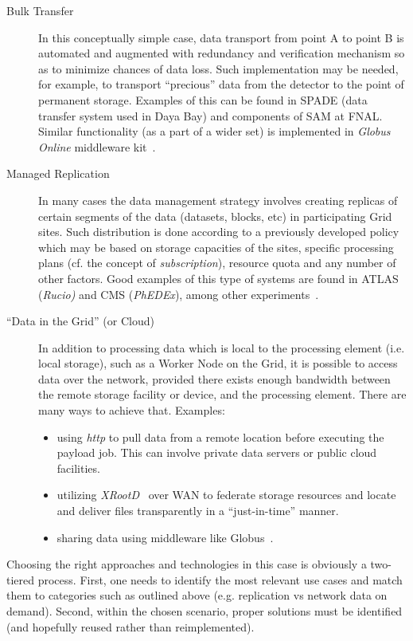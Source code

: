 \begin{description}
\item[Bulk Transfer] In this conceptually simple case, data transport from point A to point B is automated and augmented
with redundancy and verification mechanism so as to minimize chances of data loss. Such implementation may be needed,
for example, to transport ``precious'' data from the detector to the point of permanent storage.
Examples of this can be found in SPADE (data transfer system used in Daya Bay) and components of SAM at FNAL.
Similar functionality (as a part of a wider set) is implemented in \textit{Globus Online} middleware kit~\cite{globus}.

\item[Managed Replication] In many cases the data management strategy involves creating replicas of certain segments of the data (datasets, blocks, etc)
in participating Grid sites. Such distribution is done according to a previously developed policy which may be based on storage capacities of 
the sites, specific processing plans (cf. the concept of \textit{subscription}), resource quota and any number of other factors. Good examples of this type of systems are found in
ATLAS (\textit{Rucio)} and CMS (\textit{PhEDEx}), among other experiments~\cite{rucio_chep13,phedex_chep09}.

\item[``Data in the Grid'' (or Cloud)] In addition to processing data which is local to the processing element (i.e. local storage), such as a Worker Node
on the Grid, it is possible to access data over the network, provided there exists enough bandwidth between the remote storage
facility or device, and the processing element. There are many ways to achieve that. Examples:
\begin{itemize}
\item using \textit{http} to pull data from a remote location before executing the payload job. This can involve private data servers or public cloud facilities.
\item utilizing \textit{XRootD}~\cite{xrootd,xrootd_web} over WAN to federate storage resources and locate and deliver files transparently in a ``just-in-time'' manner.
\item sharing data using middleware like Globus~\cite{globus}.
\end{itemize}

\end{description}


Choosing the right approaches and technologies in this case is obviously a two-tiered process. First, one needs to identify the most
 relevant use cases and match them to categories such as outlined above (e.g. replication vs network data on demand). Second, within
 the chosen scenario, proper solutions must be identified (and hopefully reused rather than reimplemented).
   

